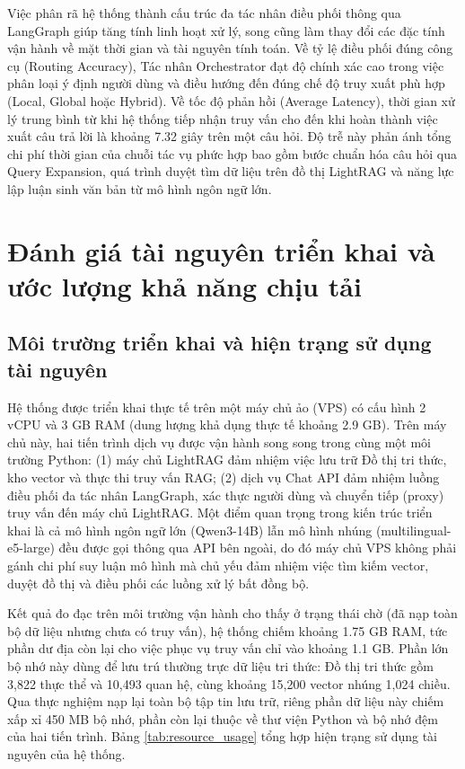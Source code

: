 Việc phân rã hệ thống thành cấu trúc đa tác nhân điều phối thông qua LangGraph giúp tăng tính linh hoạt xử lý, song cũng làm thay đổi các đặc tính vận hành về mặt thời gian và tài nguyên tính toán. Về tỷ lệ điều phối đúng công cụ (Routing Accuracy), Tác nhân Orchestrator đạt độ chính xác cao trong việc phân loại ý định người dùng và điều hướng đến đúng chế độ truy xuất phù hợp (Local, Global hoặc Hybrid). Về tốc độ phản hồi (Average Latency), thời gian xử lý trung bình từ khi hệ thống tiếp nhận truy vấn cho đến khi hoàn thành việc xuất câu trả lời là khoảng 7.32 giây trên một câu hỏi. Độ trễ này phản ánh tổng chi phí thời gian của chuỗi tác vụ phức hợp bao gồm bước chuẩn hóa câu hỏi qua Query Expansion, quá trình duyệt tìm dữ liệu trên đồ thị LightRAG và năng lực lập luận sinh văn bản từ mô hình ngôn ngữ lớn.

\section{Đánh giá tài nguyên triển khai và ước lượng khả năng chịu tải}
\label{sec:capacity_estimation}

\subsection{Môi trường triển khai và hiện trạng sử dụng tài nguyên}
Hệ thống được triển khai thực tế trên một máy chủ ảo (VPS) có cấu hình 2 vCPU và 3 GB RAM (dung lượng khả dụng thực tế khoảng 2.9 GB). Trên máy chủ này, hai tiến trình dịch vụ được vận hành song song trong cùng một môi trường Python: (1) máy chủ LightRAG đảm nhiệm việc lưu trữ Đồ thị tri thức, kho vector và thực thi truy vấn RAG; (2) dịch vụ Chat API đảm nhiệm luồng điều phối đa tác nhân LangGraph, xác thực người dùng và chuyển tiếp (proxy) truy vấn đến máy chủ LightRAG. Một điểm quan trọng trong kiến trúc triển khai là cả mô hình ngôn ngữ lớn (Qwen3-14B) lẫn mô hình nhúng (multilingual-e5-large) đều được gọi thông qua API bên ngoài, do đó máy chủ VPS không phải gánh chi phí suy luận mô hình mà chủ yếu đảm nhiệm việc tìm kiếm vector, duyệt đồ thị và điều phối các luồng xử lý bất đồng bộ.

Kết quả đo đạc trên môi trường vận hành cho thấy ở trạng thái chờ (đã nạp toàn bộ dữ liệu nhưng chưa có truy vấn), hệ thống chiếm khoảng 1.75 GB RAM, tức phần dư địa còn lại cho việc phục vụ truy vấn chỉ vào khoảng 1.1 GB. Phần lớn bộ nhớ này dùng để lưu trú thường trực dữ liệu tri thức: Đồ thị tri thức gồm 3,822 thực thể và 10,493 quan hệ, cùng khoảng 15,200 vector nhúng 1,024 chiều. Qua thực nghiệm nạp lại toàn bộ tập tin lưu trữ, riêng phần dữ liệu này chiếm xấp xỉ 450 MB bộ nhớ, phần còn lại thuộc về thư viện Python và bộ nhớ đệm của hai tiến trình. Bảng \ref{tab:resource_usage} tổng hợp hiện trạng sử dụng tài nguyên của hệ thống.

